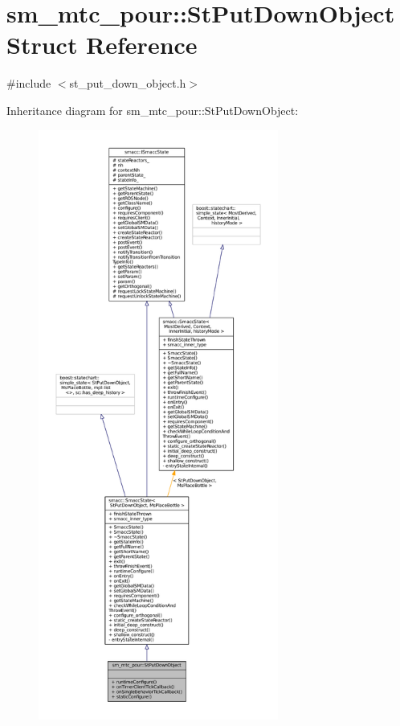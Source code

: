 \hypertarget{structsm__mtc__pour_1_1StPutDownObject}{}\section{sm\+\_\+mtc\+\_\+pour\+:\+:St\+Put\+Down\+Object Struct Reference}
\label{structsm__mtc__pour_1_1StPutDownObject}


{\ttfamily \#include $<$st\+\_\+put\+\_\+down\+\_\+object.\+h$>$}



Inheritance diagram for sm\+\_\+mtc\+\_\+pour\+:\+:St\+Put\+Down\+Object\+:
\nopagebreak
\begin{figure}[H]
\begin{center}
\leavevmode
\includegraphics[height=550pt]{structsm__mtc__pour_1_1StPutDownObject__inherit__graph}
\end{center}
\end{figure}


